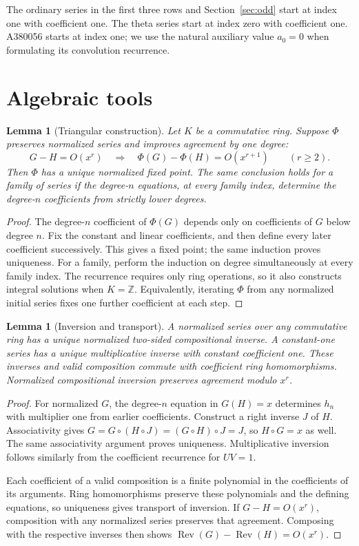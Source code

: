 \documentclass[11pt,a4paper]{article}
\newtheorem{lemma}[theorem]{Lemma}
\theoremstyle{remark}
\newcommand{\Z}{\mathbb Z}
\newcommand{\Rev}{\operatorname{Rev}}
\begin{document}
The ordinary series in the first three rows and Section~\ref{sec:odd}
start at index one with coefficient one. The theta series start at index
zero with coefficient one. A380056 starts at index one; we use the natural
auxiliary value $a_0=0$ when formulating its convolution recurrence.

\section{Algebraic tools}

\begin{lemma}[Triangular construction]\label{lem:construction}
Let $K$ be a commutative ring. Suppose $\Phi$ preserves normalized series
and improves agreement by one degree:
\[
 G-H=O(x^r)\quad\Longrightarrow\quad
 \Phi(G)-\Phi(H)=O(x^{r+1})\qquad(r\ge2).
\]
Then $\Phi$ has a unique normalized fixed point. The same conclusion holds
for a family of series if the degree-$n$ equations, at every family index,
determine the degree-$n$ coefficients from strictly lower degrees.
\end{lemma}

\begin{proof}
The degree-$n$ coefficient of $\Phi(G)$ depends only on coefficients of
$G$ below degree $n$. Fix the constant and linear coefficients, and then
define every later coefficient successively. This gives a fixed point;
the same induction proves uniqueness. For a family, perform the induction
on degree simultaneously at every family index. The recurrence requires
only ring operations, so it also constructs integral solutions when
$K=\Z$. Equivalently, iterating $\Phi$ from any normalized initial series
fixes one further coefficient at each step.
\end{proof}

\begin{lemma}[Inversion and transport]\label{lem:inverse}
A normalized series over any commutative ring has a unique normalized
two-sided compositional inverse. A constant-one series has a unique
multiplicative inverse with constant coefficient one. These inverses and
valid composition commute with coefficient ring homomorphisms.
Normalized compositional inversion preserves agreement modulo $x^r$.
\end{lemma}

\begin{proof}
For normalized $G$, the degree-$n$ equation in $G(H)=x$ determines $h_n$
with multiplier one from earlier coefficients. Construct a right inverse
$J$ of $H$. Associativity gives
$G=G\circ(H\circ J)=(G\circ H)\circ J=J$, so $H\circ G=x$ as well.
The same associativity argument proves uniqueness. Multiplicative
inversion follows similarly from the coefficient recurrence for $UV=1$.

Each coefficient of a valid composition is a finite polynomial in the
coefficients of its arguments. Ring homomorphisms preserve these
polynomials and the defining equations, so uniqueness gives transport of
inversion. If $G-H=O(x^r)$, composition with any normalized series
preserves that agreement. Composing with the respective inverses then
shows $\Rev(G)-\Rev(H)=O(x^r)$.
\end{proof}
\end{document}
